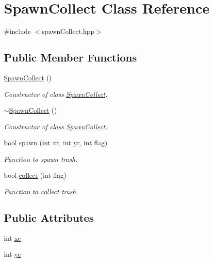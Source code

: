 \hypertarget{class_spawn_collect}{}\section{Spawn\+Collect Class Reference}
\label{class_spawn_collect}


{\ttfamily \#include $<$spawn\+Collect.\+hpp$>$}

\subsection*{Public Member Functions}
\begin{DoxyCompactItemize}
\item 
\hyperlink{class_spawn_collect_a035acd229bc57cd9bc033415bd2f8a3b}{Spawn\+Collect} ()
\begin{DoxyCompactList}\small\item\em Constructor of class \hyperlink{class_spawn_collect}{Spawn\+Collect}. \end{DoxyCompactList}\item 
\hyperlink{class_spawn_collect_ad7f73203218a60b6031f00839c84f28e}{$\sim$\+Spawn\+Collect} ()
\begin{DoxyCompactList}\small\item\em Constructor of class \hyperlink{class_spawn_collect}{Spawn\+Collect}. \end{DoxyCompactList}\item 
bool \hyperlink{class_spawn_collect_a1e9e7b7699157f36f841f7f2eea574ef}{spawn} (int xr, int yr, int flag)
\begin{DoxyCompactList}\small\item\em Function to spawn trash. \end{DoxyCompactList}\item 
bool \hyperlink{class_spawn_collect_ace0451dfd4b27aac3445aec71f60f9e7}{collect} (int flag)
\begin{DoxyCompactList}\small\item\em Function to collect trash. \end{DoxyCompactList}\end{DoxyCompactItemize}
\subsection*{Public Attributes}
\begin{DoxyCompactItemize}
\item 
int \hyperlink{class_spawn_collect_a16ff5608dbf1a872940f4c12ceda2e13}{xc}
\item 
int \hyperlink{class_spawn_collect_a3a3487468e2efe57143c449ea3c7359f}{yc}
\end{DoxyCompactItemize}



